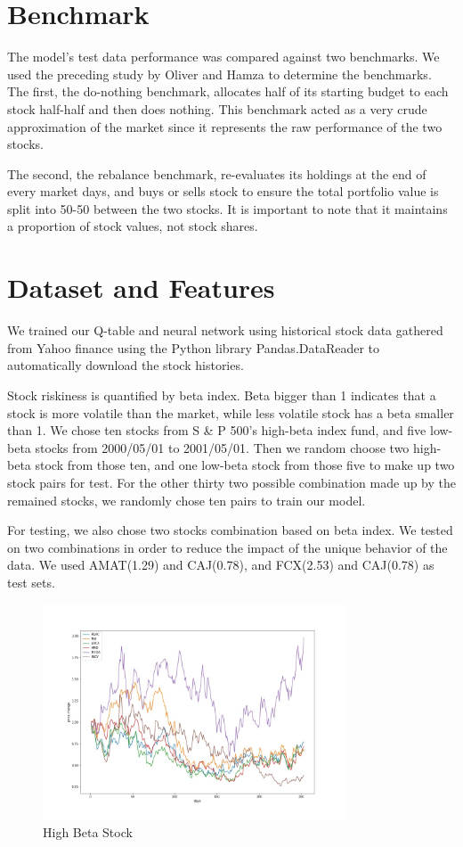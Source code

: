 \section{Benchmark}
The model’s test data performance was compared against two benchmarks. We used the preceding study by Oliver and Hamza to determine the benchmarks. The first, the do-nothing benchmark, allocates half of its starting budget to each stock half-half and then does nothing. This benchmark acted as a very crude approximation of the market since it represents the raw performance of the two stocks.

The second, the rebalance benchmark, re-evaluates its holdings at the end of every market days, and buys or sells stock to ensure the total portfolio value is split into 50-50 between the two stocks. It is important to note that it maintains a proportion of stock values, not stock shares.

\section{Dataset and Features}
We trained our Q-table and neural network using historical stock data gathered from Yahoo finance using the Python library Pandas.DataReader to automatically download the stock histories. 

Stock riskiness is quantified by beta index. Beta bigger than 1 indicates that a stock is more volatile than the market, while less volatile stock has a beta smaller than 1. We chose ten stocks from S \& P 500’s high-beta index fund, and five low-beta stocks from 2000/05/01 to 2001/05/01. Then we random choose two high-beta stock from those ten, and one low-beta stock from those five to make up two stock pairs for test. For the other thirty two possible combination made up by the remained stocks, we randomly chose ten pairs to train our model. 

For testing, we also chose two stocks combination based on beta index. We tested on two combinations in order to reduce the impact of the unique behavior of the data. We used AMAT(1.29) and CAJ(0.78), and FCX(2.53) and CAJ(0.78) as test sets. 

\begin{figure}[h]
\begin{center}
\includegraphics[clip, width=0.8\textwidth]{Graphics/highbeta_pricechange.jpg} \caption{High Beta Stock}
\end{center}
\end{figure}

